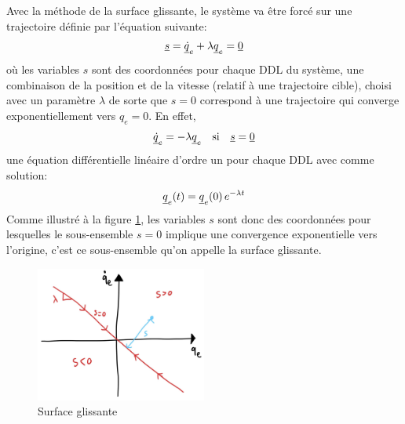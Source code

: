 Avec la méthode de la surface glissante, le système va être forcé sur une trajectoire définie par l'équation suivante:
\begin{align}
\underline{s} = \underline{\dot{q}}_e + \lambda \underline{q}_e = \underline{0}
\end{align}
où les variables $s$ sont des coordonnées pour chaque DDL du système, une combinaison de la position et de la vitesse (relatif à une trajectoire cible), choisi avec un paramètre $\lambda$ de sorte que $s=0$ correspond à une trajectoire qui converge exponentiellement vers $q_e=0$. En effet, 
\begin{align}
\underline{\dot{q}}_e = - \lambda \underline{q}_e \quad \text{si} \quad \underline{s} = \underline{0}
\end{align}
une équation différentielle linéaire d'ordre un pour chaque DDL avec comme solution:
\begin{align}
\underline{q}_e(t) = \underline{q}_e(0) \, e^{-\lambda t}
\end{align}
Comme illustré à la figure \ref{fig:slidingmode}, les variables $s$ sont donc des coordonnées pour lesquelles le sous-ensemble $s=0$ implique une convergence exponentielle vers l'origine, c'est ce sous-ensemble qu'on appelle la surface glissante.
\begin{figure}[htp]
	\centering
		\includegraphics[width=0.50\textwidth]{fig/slidingmode.jpeg}
	\caption{Surface glissante}
	\label{fig:slidingmode}
\end{figure}

